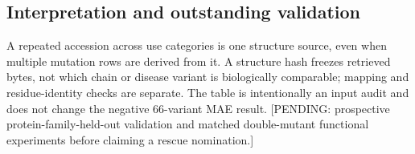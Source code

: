 \subsection{Interpretation and outstanding validation}
A repeated accession across use categories is one structure source, even when multiple mutation rows are derived from it. A structure hash freezes retrieved bytes, not which chain or disease variant is biologically comparable; mapping and residue-identity checks are separate. The table is intentionally an input audit and does not change the negative 66-variant MAE result. [PENDING: prospective protein-family-held-out validation and matched double-mutant functional experiments before claiming a rescue nomination.]
